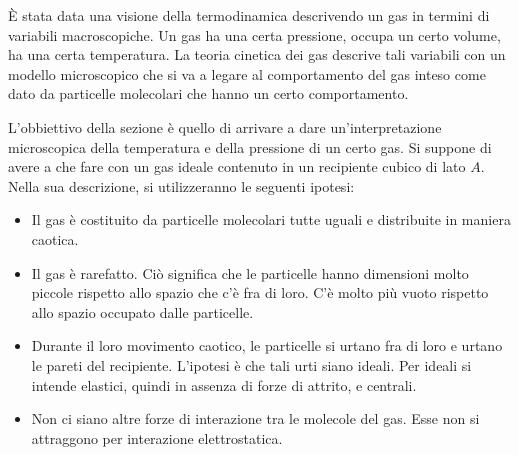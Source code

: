 È stata data una visione della termodinamica descrivendo un gas in termini di variabili macroscopiche. Un gas ha una certa pressione, occupa un certo volume, ha una certa temperatura. La teoria cinetica dei gas descrive tali variabili con un modello microscopico che si va a legare al comportamento del gas inteso come dato da particelle molecolari che hanno un certo comportamento.

L'obbiettivo della sezione è quello di arrivare a dare un'interpretazione microscopica della temperatura e della pressione di un certo gas.
Si suppone di avere a che fare con un gas ideale contenuto in un recipiente cubico di lato $A$. Nella sua descrizione, si utilizzeranno le seguenti ipotesi:

\begin{itemize}
	\item Il gas è costituito da particelle molecolari tutte uguali e distribuite in maniera caotica.
	\item Il gas è rarefatto. Ciò significa che le particelle hanno dimensioni molto piccole rispetto allo spazio che c'è fra di loro. C'è molto più vuoto rispetto allo spazio occupato dalle particelle.
	\item Durante il loro movimento caotico, le particelle si urtano fra di loro e urtano le pareti del recipiente. L'ipotesi è che tali urti siano ideali. Per ideali si intende elastici, quindi in assenza di forze di attrito, e centrali.
	\item Non ci siano altre forze di interazione tra le molecole del gas. Esse non si attraggono per interazione elettrostatica.
\end{itemize}

